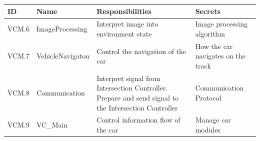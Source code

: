 \documentclass [10pt]{article}
\begin{document}
\begin{longtable}{ |p{ }  | p{ } |  p{ } |  p{ } |}  \hline
    
    \textbf{ID} & \textbf{Name} &  \textbf{Responsibilities} & \textbf{Secrets} \\ \hline
    
    \cellcolor{tableCell}VCM.6  & \cellcolor{tableCell}ImageProcessing & \cellcolor{tableCell}Interpret image into environment state & \cellcolor{tableCell}Image processing algorithm  \\ \hline
    
    VCM.7 & VehicleNavigaton & Control the navigation of the car & How the car navigates on the track \\ \hline
    
    \cellcolor{tableCell}VCM.8  & \cellcolor{tableCell}Communication & \cellcolor{tableCell} Interpret signal from Intersection Controller. Prepare and send signal to the Intersection Controller & \cellcolor{tableCell}Communication Protocol \\ \hline

    VCM.9 & VC\_Main & Control information flow of the car & Manage car modules \\ \hline
    
\end{longtable}




\end{document}

